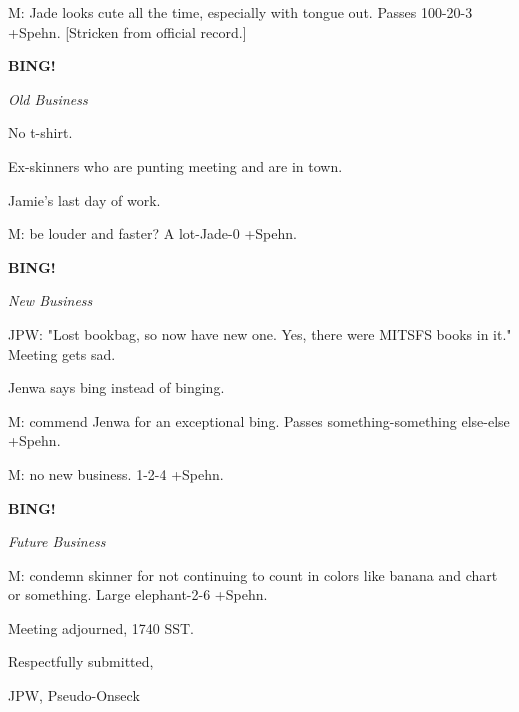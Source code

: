 \documentclass[12pt]{article}
\newcommand{\bing}{{\bf BING!} }
\newcommand{\goto}[1]{\bing \vskip 12pt \centerline{{\em{#1}}}}
\begin{document}
M: Jade looks cute all the time, especially with tongue out. Passes 100-20-3 +Spehn. [Stricken from official record.]

\goto{Old Business}

No t-shirt.

Ex-skinners who are punting meeting and are in town.

Jamie's last day of work.

M: be louder and faster? A lot-Jade-0 +Spehn.

\goto{New Business}

JPW: "Lost bookbag, so now have new one. Yes, there were MITSFS books in it." Meeting gets sad.

Jenwa says bing instead of binging.

M: commend Jenwa for an exceptional bing. Passes something-something else-else +Spehn.

M: no new business. 1-2-4 +Spehn.

\goto{Future Business}

M: condemn skinner for not continuing to count in colors like banana and chart or something. Large elephant-2-6 +Spehn.

\vspace{12pt}

\noindent
Meeting adjourned, 1740 SST.

\vspace{18pt}

\centerline{Respectfully submitted,}
\centerline{JPW, Pseudo-Onseck}
\end{document}
